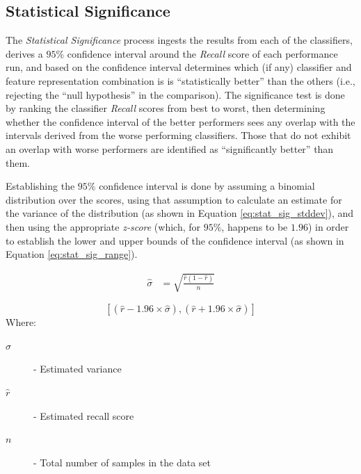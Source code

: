 \documentclass[conference]{sig-alternate-05-2015}
\begin{document}
\subsection{Statistical Significance}\label{subsec:stat_significance}
The \textit{Statistical Significance} process ingests the results from each of
the classifiers, derives a $95$\% confidence interval around the \textit{Recall}
score of each performance run, and based on the confidence interval determines
which (if any) classifier and feature representation combination is is
``statistically better'' than the others (i.e., rejecting the
``null hypothesis'' in the comparison). The significance test is done by ranking
the classifier \textit{Recall} scores from best to worst, then determining
whether the confidence interval of the better performers sees any overlap with
the intervals derived from the worse performing classifiers. Those that do not
exhibit an overlap with worse performers are identified as ``significantly
better'' than them.\par

Establishing the $95\%$ confidence interval is done by
assuming a binomial distribution over the scores, using that assumption to
calculate an estimate for the variance of the distribution (as shown
in Equation \ref{eq:stat_sig_stddev}), and then using the appropriate
\textit{z-score} (which, for $95\%$, happens to be $1.96$) in order to establish
the lower and upper bounds of the confidence interval (as shown in Equation
\ref{eq:stat_sig_range}).\par

\noindent\hrulefill
\begin{equation}
  \label{eq:stat_sig_stddev}
  \begin{aligned}
    \hat{\sigma} &= \sqrt{\frac{\hat{r}(1-\hat{r})}{n}}
  \end{aligned}
\end{equation}

\begin{equation}
  \label{eq:stat_sig_range}
  [(\hat{r} - 1.96 \times \hat{\sigma}), (\hat{r} + 1.96 \times \hat{\sigma})]
\end{equation}
\noindent Where:
\begin{description}
  \item[$\hat{\sigma}$] - Estimated variance
  \item[$\hat{r}$] - Estimated recall score
  \item[$n$] - Total number of samples in the data set  
\end{description}
\noindent\hrulefill
\end{document}
